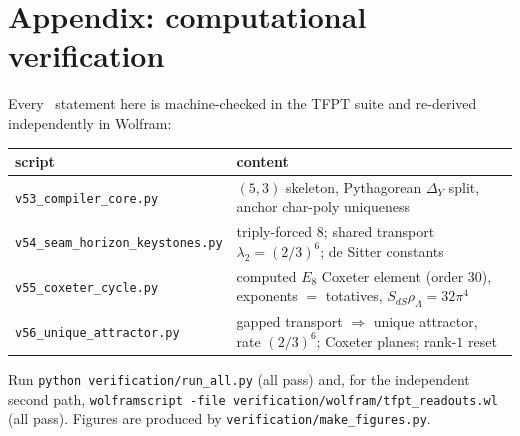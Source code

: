 \section*{Appendix: computational verification}
Every \mE\ statement here is machine-checked in the TFPT suite and re-derived independently in Wolfram:
\begin{center}\small\renewcommand{\arraystretch}{1.2}
\begin{tabularx}{\linewidth}{@{}p{4.7cm}Y@{}}
\toprule
\textbf{script} & \textbf{content} \\
\midrule
\texttt{v53\_compiler\_core.py} & $(5,3)$ skeleton, Pythagorean $\Delta_Y$ split, anchor char-poly uniqueness \\
\texttt{v54\_seam\_horizon\_keystones.py} & triply-forced $8$; shared transport $\lambda_2{=}(2/3)^6$; de Sitter constants \\
\texttt{v55\_coxeter\_cycle.py} & computed $E_8$ Coxeter element (order $30$), exponents $=$ totatives, $S_{dS}\rho_\Lambda{=}32\pi^4$ \\
\texttt{v56\_unique\_attractor.py} & gapped transport $\Rightarrow$ unique attractor, rate $(2/3)^6$; Coxeter planes; rank-$1$ reset \\
\bottomrule
\end{tabularx}
\end{center}
Run \texttt{python verification/run\_all.py} (all pass) and, for the independent second path,
\texttt{wolframscript -file\allowbreak{} verification/\allowbreak wolfram/\allowbreak tfpt\_readouts.wl}
(all pass). Figures are produced by \texttt{verification/\allowbreak make\_figures.py}.




